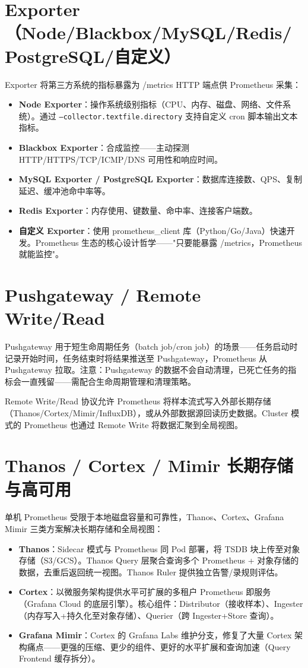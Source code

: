 \documentclass[12pt,UTF8]{ctexbook}
\begin{document}
  \section{Exporter（Node/Blackbox/MySQL/Redis/PostgreSQL/自定义）}

Exporter 将第三方系统的指标暴露为 /metrics HTTP 端点供 Prometheus 采集：

\begin{itemize}
	\item \textbf{Node Exporter}：操作系统级别指标（CPU、内存、磁盘、网络、文件系统）。通过 \texttt{--collector.textfile.directory} 支持自定义 cron 脚本输出文本指标。
	\item \textbf{Blackbox Exporter}：合成监控——主动探测 HTTP/HTTPS/TCP/ICMP/DNS 可用性和响应时间。
	\item \textbf{MySQL Exporter / PostgreSQL Exporter}：数据库连接数、QPS、复制延迟、缓冲池命中率等。
	\item \textbf{Redis Exporter}：内存使用、键数量、命中率、连接客户端数。
	\item \textbf{自定义 Exporter}：使用 prometheus\_client 库（Python/Go/Java）快速开发。Prometheus 生态的核心设计哲学——"只要能暴露 /metrics，Prometheus 就能监控"。
\end{itemize}

  \section{Pushgateway / Remote Write/Read}

Pushgateway 用于短生命周期任务（batch job/cron job）的场景——任务启动时记录开始时间，任务结束时将结果推送至 Pushgateway，Prometheus 从 Pushgateway 拉取。注意：Pushgateway 的数据不会自动清理，已死亡任务的指标会一直残留——需配合生命周期管理和清理策略。

Remote Write/Read 协议允许 Prometheus 将样本流式写入外部长期存储（Thanos/Cortex/Mimir/InfluxDB），或从外部数据源回读历史数据。Cluster 模式的 Prometheus 也通过 Remote Write 将数据汇聚到全局视图。

  \section{Thanos / Cortex / Mimir 长期存储与高可用}

单机 Prometheus 受限于本地磁盘容量和可靠性，Thanos、Cortex、Grafana Mimir 三类方案解决长期存储和全局视图：

\begin{itemize}
	\item \textbf{Thanos}：Sidecar 模式与 Prometheus 同 Pod 部署，将 TSDB 块上传至对象存储（S3/GCS）。Thanos Query 层聚合查询多个 Prometheus + 对象存储的数据，去重后返回统一视图。Thanos Ruler 提供独立告警/录规则评估。
	\item \textbf{Cortex}：以微服务架构提供水平可扩展的多租户 Prometheus 即服务（Grafana Cloud 的底层引擎）。核心组件：Distributor（接收样本）、Ingester（内存写入+持久化至对象存储）、Querier（跨 Ingester+Store 查询）。
	\item \textbf{Grafana Mimir}：Cortex 的 Grafana Labs 维护分支，修复了大量 Cortex 架构痛点——更强的压缩、更少的组件、更好的水平扩展和查询加速（Query Frontend 缓存拆分）。
\end{itemize}
\end{document}
